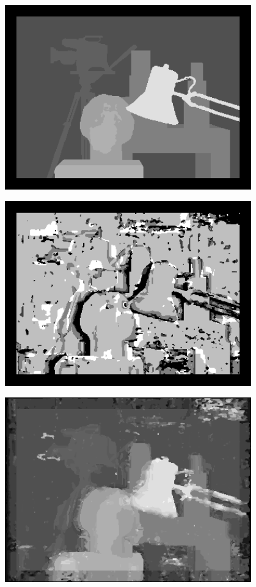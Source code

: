 \documentclass[a4paper]{scrartcl}
\begin{document}
\vspace{1cm}
\begin{minipage}{0.8\textwidth}
  \centering
    \includegraphics[width=0.8\textwidth]{../lab_4_stereo_matching/GT.png}
\end{minipage}

\vspace{1cm}
\begin{minipage}{0.8\textwidth}
  \centering
    \includegraphics[width=0.8\textwidth]{opt-block-size.png}
\end{minipage}

\vspace{1cm}
\begin{minipage}{0.8\textwidth}
  \centering
    \includegraphics[width=0.8\textwidth]{disparity-gt-ssd-d20-m1.png}
\end{minipage}
\end{document}
